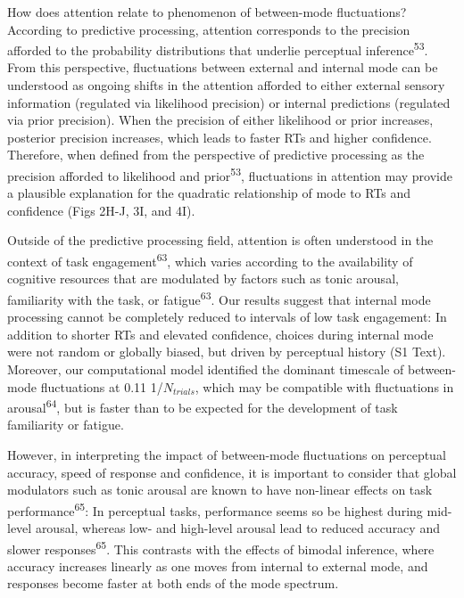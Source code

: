 \documentclass[
]{article}
\begin{document}
How does attention relate to phenomenon of between-mode fluctuations?
According to predictive processing, attention corresponds to the
precision afforded to the probability distributions that underlie
perceptual inference\textsuperscript{53}. From this perspective,
fluctuations between external and internal mode can be understood as
ongoing shifts in the attention afforded to either external sensory
information (regulated via likelihood precision) or internal predictions
(regulated via prior precision). When the precision of either likelihood
or prior increases, posterior precision increases, which leads to faster
RTs and higher confidence. Therefore, when defined from the perspective
of predictive processing as the precision afforded to likelihood and
prior\textsuperscript{53}, fluctuations in attention may provide a
plausible explanation for the quadratic relationship of mode to RTs and
confidence (Figs 2H-J, 3I, and 4I).

Outside of the predictive processing field, attention is often
understood in the context of task engagement\textsuperscript{63}, which
varies according to the availability of cognitive resources that are
modulated by factors such as tonic arousal, familiarity with the task,
or fatigue\textsuperscript{63}. Our results suggest that internal mode
processing cannot be completely reduced to intervals of low task
engagement: In addition to shorter RTs and elevated confidence, choices
during internal mode were not random or globally biased, but driven by
perceptual history (S1 Text). Moreover, our computational
model identified the dominant timescale of between-mode fluctuations at
0.11 1/\(N_{trials}\), which may be compatible with fluctuations in
arousal\textsuperscript{64}, but is faster than to be expected for the
development of task familiarity or fatigue.

However, in interpreting the impact of between-mode fluctuations on
perceptual accuracy, speed of response and confidence, it is important
to consider that global modulators such as tonic arousal are known to
have non-linear effects on task performance\textsuperscript{65}: In
perceptual tasks, performance seems so be highest during mid-level
arousal, whereas low- and high-level arousal lead to reduced accuracy
and slower responses\textsuperscript{65}. This contrasts with the
effects of bimodal inference, where accuracy increases linearly as one
moves from internal to external mode, and responses become faster at
both ends of the mode spectrum.
\end{document}
